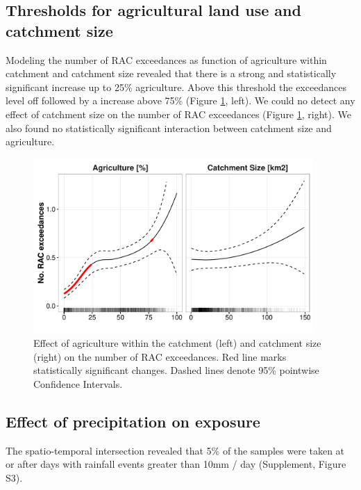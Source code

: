 \documentclass[journal=esthag,manuscript=article]{achemso}
\begin{document}
\subsection{Thresholds for agricultural land use and catchment size}
Modeling the number of RAC exceedances as function of agriculture within catchment and catchment size revealed that there is a strong and statistically significant increase up to 25\% agriculture.
Above this threshold the exceedances level off followed by a increase above 75\% (Figure \ref{fig:fig4}, left).
We could no detect any effect of catchment size on the number of RAC exceedances (Figure \ref{fig:fig4}, right).
We also found no statistically significant interaction between catchment size and agriculture.

\begin{figure}[ht]
  \includegraphics[width=0.95\textwidth]{figure4.pdf}
  \caption{Effect of agriculture within the catchment (left) and catchment size (right) on the number of RAC exceedances. Red line marks statistically significant changes. Dashed lines denote 95\% pointwise Confidence Intervals.
  }
  \label{fig:fig4}
\end{figure}



\subsection{Effect of precipitation on exposure}

The spatio-temporal intersection revealed that 5\% of the samples were taken at or after days with rainfall events greater than 10mm / day (Supplement, Figure S3).
\end{document}
